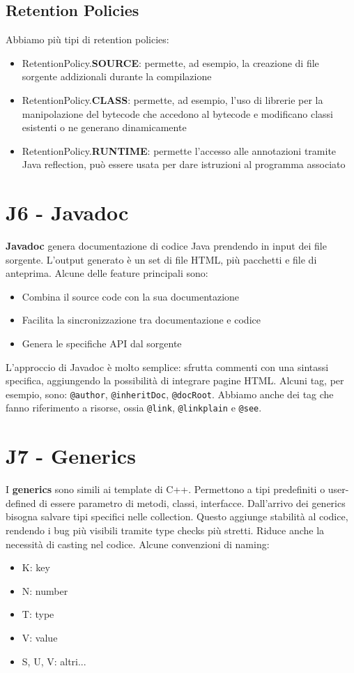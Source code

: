 \documentclass[11pt]{article}
\newcommand{\code}[1]{\texttt{#1}}
\begin{document}
\subsection{Retention Policies}
Abbiamo più tipi di retention policies:
\begin{itemize}
    \item RetentionPolicy.\textbf{SOURCE}: permette, ad esempio, la creazione di file sorgente addizionali durante la compilazione
    \item RetentionPolicy.\textbf{CLASS}: permette, ad esempio, l'uso di librerie per la manipolazione del bytecode che accedono al bytecode e modificano classi esistenti o ne generano dinamicamente
    \item RetentionPolicy.\textbf{RUNTIME}: permette l'accesso alle annotazioni tramite Java reflection, può essere usata per dare istruzioni al programma associato
\end{itemize}
\section{J6 - Javadoc}
\textbf{Javadoc} genera documentazione di codice Java prendendo in input dei file sorgente. L'output generato è un set di file HTML, più pacchetti e file di anteprima. 
Alcune delle feature principali sono:
\begin{itemize}
    \item Combina il source code con la sua documentazione
    \item Facilita la sincronizzazione tra documentazione e codice
    \item Genera le specifiche API dal sorgente
\end{itemize}
L'approccio di Javadoc è molto semplice: sfrutta commenti con una sintassi specifica, aggiungendo la possibilità di integrare pagine HTML. 
Alcuni tag, per esempio, sono: \code{@author}, \code{@inheritDoc}, \code{@docRoot}. Abbiamo anche dei tag che fanno riferimento a risorse, ossia \code{@link}, \code{@linkplain} e \code{@see}.
\section{J7 - Generics}
I \textbf{generics} sono simili ai template di C++. Permettono a tipi predefiniti o user-defined di essere parametro di metodi, classi, interfacce. Dall'arrivo dei generics bisogna salvare tipi specifici nelle collection. Questo aggiunge stabilità al codice, rendendo i bug più visibili tramite type checks più stretti. Riduce anche la necessità di casting nel codice. Alcune convenzioni di naming:
\begin{itemize}
    \item K: key
    \item N: number 
    \item T: type
    \item V: value
    \item S, U, V: altri...
\end{itemize}
\end{document}
